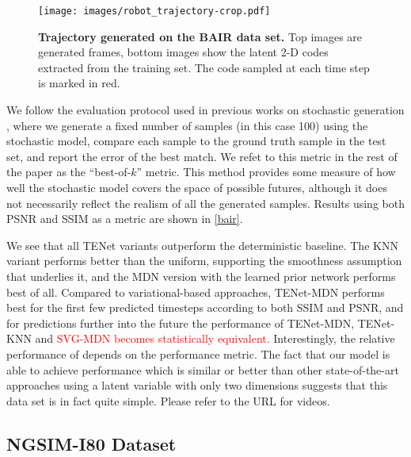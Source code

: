 \documentclass{article}
\begin{document}
\begin{figure}
  \centering
  \centering
  \texttt{[image: images/robot\_trajectory-crop.pdf]}
  \caption{
    \textbf{Trajectory generated on the BAIR data set.}
    Top images are generated frames, bottom images show the latent 2-D codes extracted from the training set.
    The code sampled at each time step is marked in red.
  }
  \label{robot-trajectory}
\end{figure}

We follow the evaluation protocol used in previous works on stochastic generation \citep{Walker2016, Babaeizadeh2018, Denton2018}, where we generate a fixed number of samples (in this case 100) using the stochastic model, compare each sample to the ground truth sample in the test set, and report the error of the best match.
We refet to this metric in the rest of the paper as the ``best-of-$k$'' metric.
This method provides some measure of how well the stochastic model covers the space of possible futures, although it does not necessarily reflect the realism of all the generated samples.
Results using both PSNR and SSIM \citep{SSIM} as a metric are shown in \cref{bair}.

We see that all TENet variants outperform the deterministic baseline.
The KNN variant performs better than the uniform, supporting the smoothness assumption that underlies it, and the MDN version with the learned prior network performs best of all.
Compared to variational-based approaches, TENet-MDN performs best for the first few predicted timesteps according to both SSIM and PSNR, and for predictions further into the future the performance of TENet-MDN, TENet-KNN and \textcolor{red}{SVG-MDN becomes statistically equivalent.}
Interestingly, the relative performance of \citep{Babaeizadeh2018} depends on the performance metric.
The fact that our model is able to achieve performance which is similar or better than other state-of-the-art approaches using a latent variable with only two dimensions suggests that this data set is in fact quite simple.
Please refer to the URL for videos.

\subsection{NGSIM-I80 Dataset}
\end{document}
